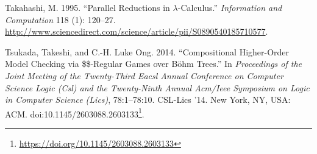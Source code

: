 \documentclass[a4paper, 12pt, twoside]{style/ociamthesis}
\theoremstyle{plain}
\theoremstyle{definition}
\theoremstyle{remark}
\renewcommand{\href}[2]{#2\footnote{\url{#1}}}
\begin{document}
\hypertarget{ref-takahashi95}{}
Takahashi, M. 1995. ``Parallel Reductions in \(\lambda\)-Calculus.''
\emph{Information and Computation} 118 (1): 120--27.
\url{http://www.sciencedirect.com/science/article/pii/S0890540185710577}.

\hypertarget{ref-tsukada14}{}
Tsukada, Takeshi, and C.-H. Luke Ong. 2014. ``Compositional Higher-Order
Model Checking via \$\$-Regular Games over Böhm Trees.'' In
\emph{Proceedings of the Joint Meeting of the Twenty-Third Eacsl Annual
Conference on Computer Science Logic (Csl) and the Twenty-Ninth Annual
Acm/Ieee Symposium on Logic in Computer Science (Lics)}, 78:1--78:10.
CSL-Lics '14. New York, NY, USA: ACM.
doi:\href{https://doi.org/10.1145/2603088.2603133}{10.1145/2603088.2603133}.

\end{document}

